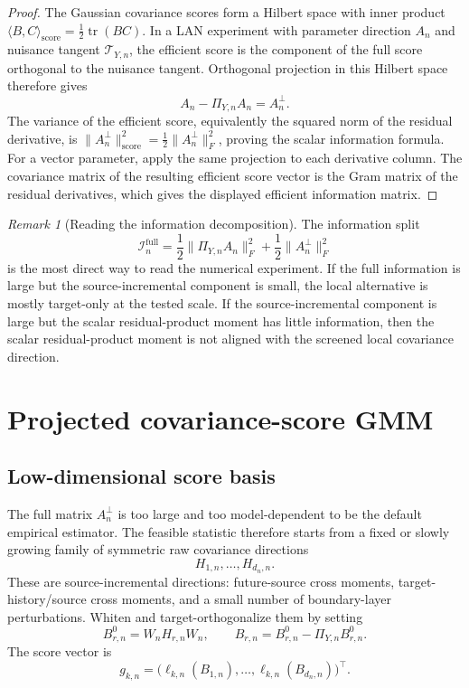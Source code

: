 \documentclass[11pt,a4paper]{amsart}
\theoremstyle{plain}
\theoremstyle{definition}
\theoremstyle{remark}
\newtheorem{remark}[theorem]{Remark}
\DeclareMathOperator{\tr}{tr}
\newcommand{\scrT}{\mathcal{T}}
\newcommand{\scrI}{\mathcal{I}}
\begin{document}
\begin{proof}
The Gaussian covariance scores form a Hilbert space with inner product
\(\langle B,C\rangle_{\mathrm{score}}=\frac12\tr(BC)\).  In a LAN experiment with parameter
direction \(A_n\) and nuisance tangent \(\scrT_{Y,n}\), the efficient score is the component of
the full score orthogonal to the nuisance tangent.  Orthogonal projection in this Hilbert space
therefore gives
\[
        A_n-\Pi_{Y,n}A_n=A_n^\perp.
\]
The variance of the efficient score, equivalently the squared norm of the residual derivative, is
\(\|A_n^\perp\|_{\mathrm{score}}^2=\frac12\|A_n^\perp\|_F^2\), proving the scalar information
formula.  For a vector parameter, apply the same projection to each derivative column.  The
covariance matrix of the resulting efficient score vector is the Gram matrix of the residual
derivatives, which gives the displayed efficient information matrix.
\end{proof}

\begin{remark}[Reading the information decomposition]
The information split
\[
        \scrI_n^{\mathrm{full}}
        =
        \frac12\|\Pi_{Y,n}A_n\|_F^2
        +
        \frac12\|A_n^{\perp}\|_F^2
\]
is the most direct way to read the numerical experiment.  If the full information is large but the
source-incremental component is small, the local alternative is mostly target-only at the tested
scale.  If the source-incremental component is large but the scalar residual-product moment has
little information, then the scalar residual-product moment is not aligned with the screened
local covariance direction.
\end{remark}

\section{Projected covariance-score GMM}\label{sec:pcov-gmm}

\subsection{Low-dimensional score basis}

The full matrix \(A_n^{\perp}\) is too large and too model-dependent to be the default empirical
estimator.  The feasible statistic therefore starts from a fixed or slowly growing family of
symmetric raw covariance directions
\[
        H_{1,n},\dots,H_{d_n,n}.
\]
These are source-incremental directions: future-source cross moments, target-history/source
cross moments, and a small number of boundary-layer perturbations.  Whiten and target-orthogonalize
them by setting
\[
        B_{r,n}^{0}
        =
        W_n H_{r,n}W_n,
        \qquad
        B_{r,n}
        =
        B_{r,n}^{0}-\Pi_{Y,n}B_{r,n}^{0}.
\]
The score vector is
\[
        g_{k,n}
        =
        \bigl(
        \ell_{k,n}(B_{1,n}),
        \dots,
        \ell_{k,n}(B_{d_n,n})
        \bigr)^\top.
\]
\end{document}
